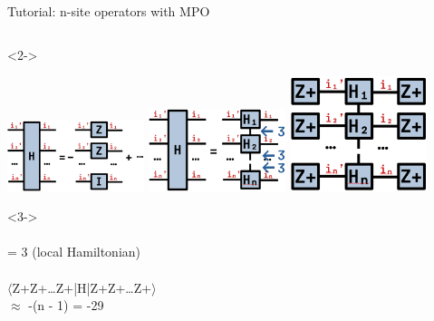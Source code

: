 \begin{frame}[fragile]{Tutorial: n-site operators with MPO}
\begin{columns}
\begin{column}{5.5cm}
\begin{onlyenv}<2->
\vspace*{0.0cm}
\begin{center}
\includegraphics[width=0.3\textwidth]{
  slides/assets/isingn.png
}
\includegraphics[width=0.3\textwidth]{
  slides/assets/isingn_mpo.png
}
\includegraphics[width=0.3\textwidth]{
  slides/assets/Zpn_H_Zpn.png
}
\end{center}
\vspace*{0.0cm}
\end{onlyenv}

\begin{onlyenv}<3->
~\\
~\\
= 3 (local Hamiltonian) \\
~\\
$\langle$Z+Z+…Z+|H|Z+Z+…Z+$\rangle$ \\
  $\approx$ -(n - 1) = -29
\end{onlyenv}

\end{column}

\end{columns}

\end{frame}
